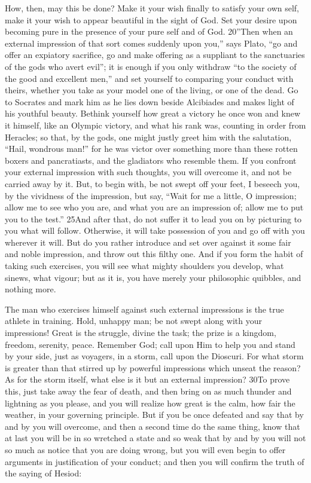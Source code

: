How, then, may this be done? Make it your wish finally to satisfy your own self, make it your wish to appear beautiful in the sight of God. Set your desire upon becoming pure in the presence of your pure self and of God. 20''Then when an external impression of that sort comes suddenly upon you,'' says Plato, ``go and offer an expiatory sacrifice, go and make offering as a suppliant to the sanctuaries of the gods who avert evil''; it is enough if you only withdraw ``to the society of the good and excellent men,'' and set yourself to comparing your conduct with theirs, whether you take as your model one of the living, or one of the dead. Go to Socrates and mark him as he lies down beside Alcibiades and makes light of his youthful beauty. Bethink yourself how great a victory he once won and knew it himself, like an Olympic victory, and what his rank was, counting in order from Heracles; so that, by the gods, one might justly greet him with the salutation, ``Hail, wondrous man!'' for he was victor over something more than these rotten boxers and pancratiasts, and the gladiators who resemble them. If you confront your external impression with such thoughts, you will overcome it, and not be carried away by it. But, to begin with, be not swept off your feet, I beseech you, by the vividness of the impression, but say, ``Wait for me a little, O impression; allow me to see who you are, and what you are an impression of; allow me to put you to the test.'' 25And after that, do not suffer it to lead you on by picturing to you what will follow. Otherwise, it will take possession of you and go off with you wherever it will. But do you rather introduce and set over against it some fair and noble impression, and throw out this filthy one. And if you form the habit of taking such exercises, you will see what mighty shoulders you develop, what sinews, what vigour; but as it is, you have merely your philosophic quibbles, and nothing more.

The man who exercises himself against such external impressions is the true athlete in training. Hold, unhappy man; be not swept along with your impressions! Great is the struggle, divine the task; the prize is a kingdom, freedom, serenity, peace. Remember God; call upon Him to help you and stand by your side, just as voyagers, in a storm, call upon the Dioscuri. For what storm is greater than that stirred up by powerful impressions which unseat the reason? As for the storm itself, what else is it but an external impression? 30To prove this, just take away the fear of death, and then bring on as much thunder and lightning as you please, and you will realize how great is the calm, how fair the weather, in your governing principle. But if you be once defeated and say that by and by you will overcome, and then a second time do the same thing, know that at last you will be in so wretched a state and so weak that by and by you will not so much as notice that you are doing wrong, but you will even begin to offer arguments in justification of your conduct; and then you will confirm the truth of the saying of Hesiod:

